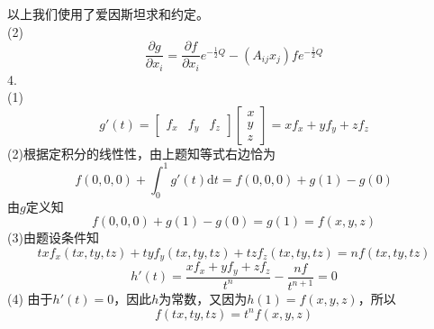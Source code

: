 \documentclass[utf8]{ctexart}
\begin{document}
以上我们使用了爱因斯坦求和约定。\\
(2)
\[\frac{\partial g}{\partial x_i}=\frac{\partial f}{\partial x_i}e^{-\frac{1}{2}Q}-(A_{ij}x_j)fe^{-\frac{1}{2}Q}\]
4.\\
(1)
\[g'(t)=\begin{bmatrix}
	f_x&f_y&f_z
\end{bmatrix}\begin{bmatrix}
x\\
y\\
z
\end{bmatrix}=xf_x+yf_y+zf_z\]
(2)根据定积分的线性性，由上题知等式右边恰为
\[f(0,0,0)+\int_{0}^{1}g'(t)\mathrm{d}t=f(0,0,0)+g(1)-g(0)\]
由$g$定义知
\[f(0,0,0)+g(1)-g(0)=g(1)=f(x,y,z)\]
(3)由题设条件知
\[txf_x(tx,ty,tz)+tyf_y(tx,ty,tz)+tzf_z(tx,ty,tz)=nf(tx,ty,tz)\]
\[h'(t)=\frac{xf_x+yf_y+zf_z}{t^n}-\frac{nf}{t^{n+1}}=0\]
(4)
由于$h'(t)=0$，因此$h$为常数，又因为$h(1)=f(x,y,z)$，所以
\[f(tx,ty,tz)=t^nf(x,y,z)\]
\end{document}
